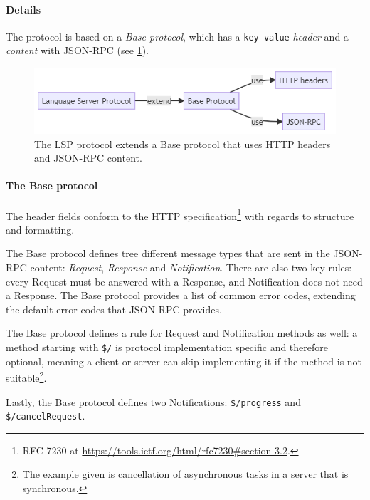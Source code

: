 \paragraph*{Details}
The protocol is based on a \emph{Base protocol}, which has a \texttt{key-value} \emph{header} and a \emph{content} with \gls{JSON-RPC} (see \cref{fig:lsp-protocol}).

\begin{figure}[htbp]
  \centering
  \includegraphics[width=\textwidth]{figures/lsp-protocol}
  \caption[The LSP Protocol]{The LSP protocol extends a Base protocol that uses HTTP headers and JSON-RPC content.}\label{fig:lsp-protocol}
\end{figure}

\paragraph*{The Base protocol}
The header fields conform to the HTTP specification\footnote{RFC-7230 at \href{https://tools.ietf.org/html/rfc7230\#section-3.2}{https://tools.ietf.org/html/rfc7230\#section-3.2}.} with regards to structure and formatting.

The Base protocol defines tree different message types that are sent in the \gls{JSON-RPC} content: \emph{Request}, \emph{Response} and \emph{Notification}.
There are also two key rules: every Request must be answered with a Response, and Notification does not need a Response.
The Base protocol provides a list of common error codes, extending the default error codes that \gls{JSON-RPC} provides.~\cite{microsoftLanguageServerProtocol2020}

The Base protocol defines a rule for Request and Notification methods as well: a method starting with \texttt{\$/} is protocol implementation specific and therefore optional, meaning a client or server can skip implementing it if the method is not suitable\footnote{The example given is cancellation of asynchronous tasks in a server that is synchronous.}.~\cite{microsoftLanguageServerProtocol2020}

Lastly, the Base protocol defines two Notifications: \texttt{\$/progress} and \texttt{\$/cancelRequest}.~\cite{microsoftLanguageServerProtocol2020}

